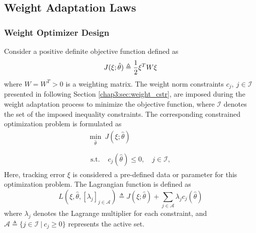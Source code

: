 \subsection{Weight Adaptation Laws} \label{chap3:sec:weight_adap}

\subsubsection{Weight Optimizer Design}

Consider a positive definite objective function defined as 
\begin{equation}
    J(\xi;\hat\theta)\triangleq 
    {1\over 2} \xi^T   W\xi
\end{equation}
where $W=W^T  >0$ is a weighting matrix.
The weight norm constraints $c_j,\ j\in\mathcal{I}$ presented in following Section \ref{chap3:sec:weight_cstr}, are imposed during the weight adaptation process to minimize the objective function, where $\mathcal I$ denotes the set of the imposed inequality constraints.
The corresponding constrained optimization problem is formulated as
\begin{equation}
    \begin{matrix}
        \min_{\hat\theta} \ J(\xi;\hat\theta)
        \\ \\
        \begin{aligned}
        \text{s.t. }&c_{j}(\hat\theta) 
        \le0, \quad j\in\mathcal{I},
        \end{aligned}
    \end{matrix}
    \label{chap3:eq:train_obj}
\end{equation}
Here, tracking error $\xi$ is considered a pre-defined data or parameter for this optimization problem. The Lagrangian function is defined as
\begin{equation}
    L(\xi,\hat\theta,[\lambda_j]_{j\in\mathcal A}) \triangleq J(\xi;\hat\theta) + 
    \sum_{j\in\mathcal A}
    \lambda_{j}
    c_{j}(\hat\theta)
\end{equation}
where $\lambda_j$ denotes the Lagrange multiplier for each constraint, and $\mathcal A \triangleq \{j\in\mathcal I\ |\ c_j\ge 0\}$ represents the active set.

